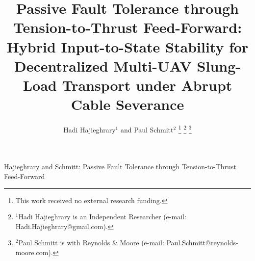 \documentclass[lettersize,journal]{IEEEtran}
\begin{document}
\title{Passive Fault Tolerance through Tension-to-Thrust Feed-Forward: Hybrid Input-to-State Stability for Decentralized Multi-UAV Slung-Load Transport under Abrupt Cable Severance}
\author{Hadi Hajieghrary$^{1}$ and Paul Schmitt$^{2}$%
\thanks{This work received no external research funding.}%
\thanks{$^{1}$Hadi Hajieghrary is an Independent Researcher (e-mail: Hadi.Hajieghrary@gmail.com).}%
\thanks{$^{2}$Paul Schmitt is with Reynolds \& Moore (e-mail: Paul.Schmitt@reynolds-moore.com).}}


%
{Hajieghrary and Schmitt: Passive Fault Tolerance through Tension-to-Thrust Feed-Forward}

\maketitle
\end{document}
